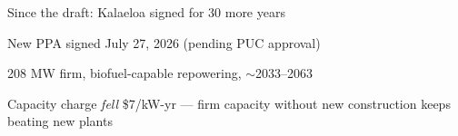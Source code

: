\documentclass[11pt,aspectratio=169]{beamer}
\begin{document}
\begin{frame}{Since the draft: Kalaeloa signed for 30 more years}
\begin{wideitemize}
  \item New PPA signed July 27, 2026 (pending PUC approval)
  \item 208 MW firm, biofuel-capable repowering, $\sim$2033--2063
  \item Capacity charge \emph{fell} \$7/kW-yr --- firm capacity without
        new construction keeps beating new plants
\end{wideitemize}
\end{frame}

\backupend
\end{document}
